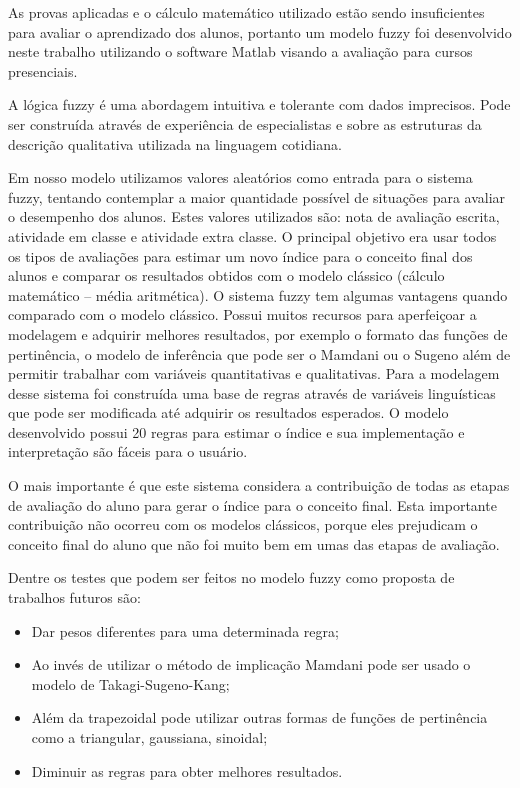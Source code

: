 \documentclass{article}
\begin{document}
As provas aplicadas e o cálculo matemático utilizado estão
sendo insuficientes para avaliar o aprendizado dos alunos,
portanto um modelo fuzzy foi desenvolvido neste trabalho
utilizando o software Matlab visando a avaliação para cursos
presenciais.


A lógica fuzzy é uma abordagem intuitiva e tolerante com dados
imprecisos. Pode ser construída através de experiência de
especialistas e sobre as estruturas da descrição qualitativa
utilizada na linguagem cotidiana.

Em nosso modelo utilizamos valores aleatórios como entrada
para o sistema fuzzy, tentando contemplar a maior quantidade
possível de situações para avaliar o desempenho dos alunos.
Estes valores utilizados são: nota de avaliação escrita,
atividade em classe e atividade extra classe. O principal
objetivo era usar todos os tipos de avaliações para estimar
um novo índice para o conceito final dos alunos e comparar os
resultados obtidos com o modelo clássico (cálculo matemático
– média aritmética). O sistema fuzzy tem algumas vantagens
quando comparado com o modelo clássico. Possui muitos recursos
para aperfeiçoar a modelagem e adquirir melhores resultados,
por exemplo o formato das funções de pertinência, o modelo de
inferência que pode ser o Mamdani ou o Sugeno além de permitir
trabalhar com variáveis quantitativas e qualitativas. Para
a modelagem desse sistema foi construída uma base de regras
através de variáveis linguísticas que pode ser modificada
até adquirir os resultados esperados. O modelo desenvolvido
possui 20 regras para estimar o índice e sua implementação e
interpretação são fáceis para o usuário.


O mais importante é que este sistema considera a contribuição
de todas as etapas de avaliação do aluno para gerar o índice
para o conceito final. Esta importante contribuição não
ocorreu com os modelos clássicos, porque eles prejudicam o
conceito final do aluno que não foi muito bem em umas das
etapas de avaliação.


Dentre os testes que podem ser feitos no modelo fuzzy como
proposta de trabalhos futuros são:

\begin{itemize}
    \item Dar pesos diferentes para uma determinada regra;
    \item Ao invés de utilizar o método de implicação
Mamdani pode ser usado o modelo de Takagi-Sugeno-Kang;
    \item Além da trapezoidal pode utilizar outras formas de
    funções de pertinência como a triangular, gaussiana,
    sinoidal;
    \item Diminuir as regras para obter melhores resultados.
\end{itemize}
\end{document}
